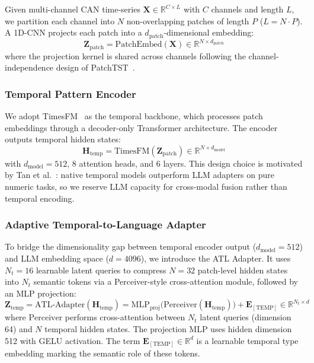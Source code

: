 \documentclass[11pt,a4paper]{article}
\begin{document}
Given multi-channel CAN time-series $\mathbf{X} \in \mathbb{R}^{C \times L}$ with $C$ channels and length $L$, we partition each channel into $N$ non-overlapping patches of length $P$ ($L = N \cdot P$). A 1D-CNN projects each patch into a $d_{\text{patch}}$-dimensional embedding:
\begin{equation}\label{eq:patch}
\mathbf{Z}_{\text{patch}} = \text{PatchEmbed}(\mathbf{X}) \in \mathbb{R}^{N \times d_{\text{patch}}}
\end{equation}
where the projection kernel is shared across channels following the channel-independence design of PatchTST~\cite{nie2023patchtst}.

\subsubsection{Temporal Pattern Encoder}\label{sec:method:encoder}

We adopt TimesFM~\cite{das2024timesfm} as the temporal backbone, which processes patch embeddings through a decoder-only Transformer architecture. The encoder outputs temporal hidden states:
\begin{equation}\label{eq:temporal}
\mathbf{H}_{\text{temp}} = \text{TimesFM}(\mathbf{Z}_{\text{patch}}) \in \mathbb{R}^{N \times d_{\text{model}}}
\end{equation}
with $d_{\text{model}} = 512$, 8 attention heads, and 6 layers. This design choice is motivated by Tan et al.~\cite{tan2024llmts}: native temporal models outperform LLM adapters on pure numeric tasks, so we reserve LLM capacity for cross-modal fusion rather than temporal encoding.

\subsubsection{Adaptive Temporal-to-Language Adapter}\label{sec:method:atl}

To bridge the dimensionality gap between temporal encoder output ($d_{\text{model}} = 512$) and LLM embedding space ($d = 4096$), we introduce the ATL Adapter. It uses $N_t = 16$ learnable latent queries to compress $N = 32$ patch-level hidden states into $N_t$ semantic tokens via a Perceiver-style cross-attention module, followed by an MLP projection:
\begin{equation}\label{eq:atl}
\mathbf{Z}_{\text{temp}} = \text{ATL-Adapter}(\mathbf{H}_{\text{temp}}) = \text{MLP}_{\text{proj}}\bigl(\text{Perceiver}(\mathbf{H}_{\text{temp}})\bigr) + \mathbf{E}_{[\text{TEMP}]} \in \mathbb{R}^{N_t \times d}
\end{equation}
where $\text{Perceiver}$ performs cross-attention between $N_t$ latent queries (dimension 64) and $N$ temporal hidden states. The projection MLP uses hidden dimension 512 with GELU activation. The term $\mathbf{E}_{[\text{TEMP}]} \in \mathbb{R}^{d}$ is a learnable temporal type embedding marking the semantic role of these tokens.
\end{document}
